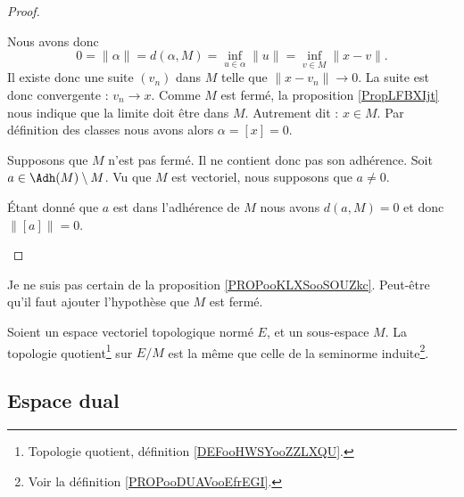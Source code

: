 \begin{proof}
\begin{subproof}
		Nous avons donc
		\begin{equation}
			0=\| \alpha \|=d(\alpha,M)=\inf_{u\in \alpha}\| u \|=\inf_{v\in M}\| x-v \|.
		\end{equation}
		Il existe donc une suite \( (v_n)\) dans \( M\) telle que \( \| x-v_n \|\to 0\). La suite est donc convergente : \( v_n\to x\). Comme \( M\) est fermé, la proposition \ref{PropLFBXIjt} nous indique que la limite doit être dans \( M\). Autrement dit : \( x\in M\). Par définition des classes nous avons alors \( \alpha=[x]=0\).

		Supposons que \( M\) n'est pas fermé. Il ne contient donc pas son adhérence. Soit \( a\in \Adh(M)\setminus M\). Vu que \( M\) est vectoriel, nous supposons que \( a\neq 0\).

		Étant donné que \( a\) est dans l'adhérence de \( M\) nous avons \( d(a,M)=0\) et donc \( \| [a] \|=0\).
	\end{subproof}
\end{proof}


\begin{probleme}    %
	Je ne suis pas certain de la proposition \ref{PROPooKLXSooSOUZkc}. Peut-être qu'il faut ajouter l'hypothèse que \( M\) est fermé.
\end{probleme}

\begin{proposition}     \label{PROPooKLXSooSOUZkc}
	Soient un espace vectoriel topologique normé \( E\), et un sous-espace \( M\). La topologie quotient\footnote{Topologie quotient, définition \ref{DEFooHWSYooZZLXQU}.} sur \( E/M\) est la même que celle de la seminorme induite\footnote{Voir la définition \ref{PROPooDUAVooEfrEGI}.}.
\end{proposition}

\subsection{Espace dual}

